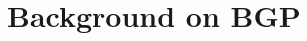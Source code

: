 \documentclass{sig-alternate-10pt}
\newcommand{\todo}[1]{\textcolor{red}{[TODO: #1]}}
\newcommand{\sysname}{{\small \sf Propane}\xspace}
\begin{document}








%
%
%
%

\section{Background on BGP}
\label{sec:background}

\end{document}
